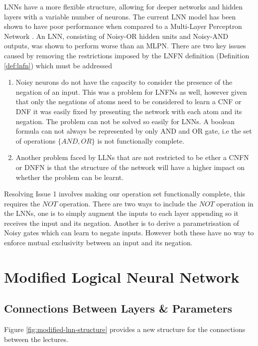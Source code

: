 LNNs have a more flexible structure, allowing for deeper networks and hidden layers with a variable number of neurons. The current LNN model has been shown to have poor performance when compared to a Multi-Layer Perceptron Network \cite{LearningLogicalActivations}. An LNN, consisting of Noisy-OR hidden units and Noisy-AND outputs, was shown to perform worse than an MLPN. There are two key issues caused by removing the restrictions imposed by the LNFN definition (Definition \ref{def:lnfn}) which must be addressed 

\begin{enumerate}
	\item Noisy neurons do not have the capacity to consider the presence of the negation of an input. This was a problem for LNFNs as well, however given that only the negations of atoms need to be considered to learn a CNF or DNF it was easily fixed by presenting the network with each atom and its negation. The problem can not be solved so easily for LNNs. A boolean formula can not always be represented by only AND and OR gate, i.e the set of operations $\{AND, OR\}$ is not functionally complete. 
	
	\item Another problem faced by LLNs that are not restricted to be ether a CNFN or DNFN is that the structure of the network will have a higher impact on whether the problem can be learnt. 
\end{enumerate}

Resolving Issue 1 involves making our operation set functionally complete, this requires the $NOT$ operation. There are two ways to include the $NOT$ operation in the LNNs, one is to simply augment the inputs to each layer appending so it receives the input and its negation. Another is to derive a parametrisation of Noisy gates which can learn to negate inputs. However both these have no way to enforce mutual exclusivity between an input and its negation.

\section{Modified Logical Neural Network} \label{sec:modified-lnn}
\subsection{Connections Between Layers \& Parameters}
Figure \ref{fig:modified-lnn-structure} provides a new structure for the connections between the lectures.

